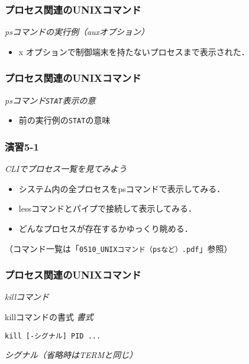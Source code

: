 \documentclass{beamer}                 %
\begin{document}
\begin{frame}[fragile]
  \frametitle{プロセス関連のUNIXコマンド}
  \emph{psコマンドの実行例（auxオプション）}

  \begin{itemize}
  \item x オプションで制御端末を持たないプロセスまで表示された．
  \end{itemize}
\end{frame}

\begin{frame}[fragile]
  \frametitle{プロセス関連のUNIXコマンド}
  \emph{psコマンド\texttt{STAT}表示の意}

  \begin{itemize}
  \item 前の実行例の\texttt{STAT}の意味
  \end{itemize}
\end{frame}

\begin{frame}[fragile]
  \frametitle{演習5-1}
  \emph{CLIでプロセス一覧を見てみよう}
\begin{itemize}
\item システム内の全プロセスをpsコマンドで表示してみる．
\item lessコマンドとパイプで接続して表示してみる．
\item どんなプロセスが存在するかゆっくり眺める． 
\end{itemize}
  （コマンド一覧は「\texttt{0510\_UNIXコマンド（psなど）.pdf}」参照）
\end{frame}

\begin{frame}[fragile]
  \frametitle{プロセス関連のUNIXコマンド}
  \emph{killコマンド}
  \begin{itembox}[l]{killコマンドの書式}
    \emph{書式}
    \begin{lstlisting}[frame=none]
    kill [-シグナル] PID ...
    \end{lstlisting}
    \emph{シグナル（省略時はTERMと同じ）}
  \end{itembox}
\end{frame}
\end{document}
